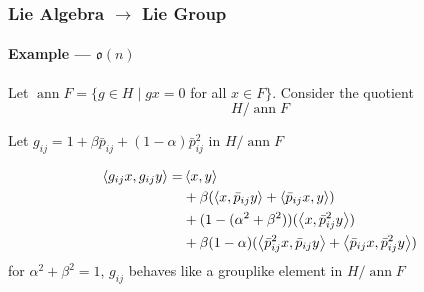 \documentclass{beamer}
\begin{document}
%
%
%
%
%
%




\begin{frame}

\frametitle{Lie Algebra $\to$ Lie Group}

\framesubtitle{Example ---  $\mathfrak{o}(n)$}

 Let $\operatorname{ann} F = \{ g \in H \mid g x = 0$ for all $x \in F \}$. Consider the quotient
%
\begin{equation*}
H/\operatorname{ann} F
\end{equation*}

 Let $g_{ij} = 1 + \beta \bar{p}_{ij} + (1 - \alpha) \bar{p}_{ij}^2$ in $H/ \operatorname{ann} F$

\begin{equation*}
\begin{split}
\left\langle g_{ij} x, g_{ij} y \right\rangle = &\left\langle x,y \right\rangle \\
&+ \beta (\left\langle x, \bar{p}_{ij} y \right\rangle + \left\langle \bar{p}_{ij} x, y \right\rangle)\\
&+ (1- (\alpha^2 + \beta^2))(\left\langle  x, \bar{p}_{ij}^2 y \right\rangle)\\
&+ \beta (1-\alpha) (\left\langle  \bar{p}_{ij}^2 x, \bar{p}_{ij} y \right\rangle + \left\langle \bar{p}_{ij} x, \bar{p}_{ij}^2 y \right\rangle )
\end{split}
\end{equation*}
for $\alpha^2 + \beta^2 = 1$, $g_{ij}$ behaves like a grouplike element in $H/\operatorname{ann} F$

\end{frame}
\end{document}
